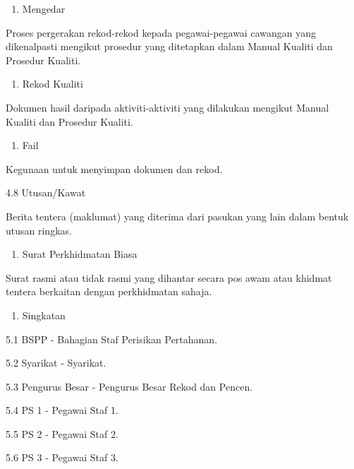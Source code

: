 \documentclass[
]{article}
\providecommand{\tightlist}{%
  \setlength{\itemsep}{0pt}\setlength{\parskip}{0pt}}
\begin{document}
\begin{enumerate}
\def\labelenumi{\arabic{enumi}.}
\setcounter{enumi}{5}
\tightlist
\item
  Mengedar
\end{enumerate}

Proses pergerakan rekod-rekod kepada pegawai-pegawai cawangan yang
dikenalpasti mengikut prosedur yang ditetapkan dalam Manual Kualiti dan
Prosedur Kualiti.

\begin{enumerate}
\def\labelenumi{\arabic{enumi}.}
\setcounter{enumi}{6}
\tightlist
\item
  Rekod Kualiti
\end{enumerate}

Dokumen hasil daripada aktiviti-aktiviti yang dilakukan mengikut Manual
Kualiti dan Prosedur Kualiti.

\begin{enumerate}
\def\labelenumi{\arabic{enumi}.}
\setcounter{enumi}{7}
\tightlist
\item
  Fail
\end{enumerate}

Kegunaan untuk menyimpan dokumen dan rekod.

4.8 Utusan/Kawat

Berita tentera (maklumat) yang diterima dari pasukan yang lain dalam
bentuk utusan ringkas.

\begin{enumerate}
\def\labelenumi{\arabic{enumi}.}
\setcounter{enumi}{8}
\tightlist
\item
  Surat Perkhidmatan Biasa
\end{enumerate}

Surat rasmi atau tidak rasmi yang dihantar secara pos awam atau khidmat
tentera berkaitan dengan perkhidmatan sahaja.

\begin{enumerate}
\def\labelenumi{\arabic{enumi}.}
\setcounter{enumi}{4}
\tightlist
\item
  Singkatan
\end{enumerate}

5.1 BSPP - Bahagian Staf Perisikan Pertahanan.

5.2 Syarikat - Syarikat.

5.3 Pengurus Besar - Pengurus Besar Rekod dan Pencen.

5.4 PS 1 - Pegawai Staf 1.

5.5 PS 2 - Pegawai Staf 2.

5.6 PS 3 - Pegawai Staf 3.
\end{document}
